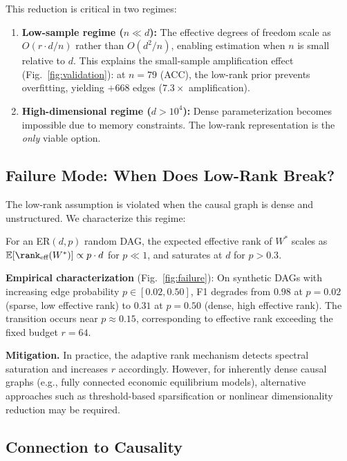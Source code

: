 This reduction is critical in two regimes:
\begin{enumerate}
\item \textbf{Low-sample regime ($n \ll d$):} The effective degrees of freedom scale as $O(r \cdot d / n)$ rather than $O(d^2 / n)$, enabling estimation when $n$ is small relative to $d$. This explains the small-sample amplification effect (Fig.~\ref{fig:validation}): at $n=79$ (ACC), the low-rank prior prevents overfitting, yielding $+668$ edges ($7.3\times$ amplification).
\item \textbf{High-dimensional regime ($d > 10^4$):} Dense parameterization becomes impossible due to memory constraints. The low-rank representation is the \emph{only} viable option.
\end{enumerate}

\subsection{Failure Mode: When Does Low-Rank Break?}

The low-rank assumption is violated when the causal graph is dense and unstructured. We characterize this regime:

\begin{definition}\label{def:effrank}
For an ER$(d, p)$ random DAG, the expected effective rank of $W^*$ scales as $\mathbb{E}[\rank_{\text{eff}}(W^*)] \propto p \cdot d$ for $p \ll 1$, and saturates at $d$ for $p > 0.3$.
\end{definition}

\textbf{Empirical characterization} (Fig.~\ref{fig:failure}): On synthetic DAGs with increasing edge probability $p \in [0.02, 0.50]$, F1 degrades from $0.98$ at $p=0.02$ (sparse, low effective rank) to $0.31$ at $p=0.50$ (dense, high effective rank). The transition occurs near $p \approx 0.15$, corresponding to effective rank exceeding the fixed budget $r = 64$.

\textbf{Mitigation.} In practice, the adaptive rank mechanism detects spectral saturation and increases $r$ accordingly. However, for inherently dense causal graphs (e.g., fully connected economic equilibrium models), alternative approaches such as threshold-based sparsification or nonlinear dimensionality reduction may be required.

\subsection{Connection to Causality}

